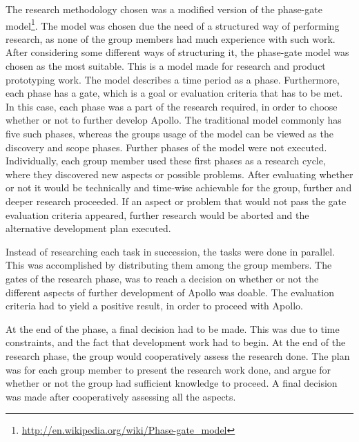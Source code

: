 The research methodology chosen was a modified version of the phase-gate model\footnote{\url{http://en.wikipedia.org/wiki/Phase-gate_model}}. The model was chosen due the need of a structured way of performing research, as none of the group members had much experience with such work. After considering some different ways of structuring it, the phase-gate model was chosen as the most suitable. This is a model made for research and product prototyping work. The model describes a time period as a phase. Furthermore, each phase has a gate, which is a goal or evaluation criteria that has to be met. In this case, each phase was a part of the research required, in order to choose whether or not to further develop Apollo. The traditional model commonly has five such phases, whereas the groups usage of the model can be viewed as the discovery and scope phases. Further phases of the model were not executed. Individually, each group member used these first phases as a research cycle, where they discovered new aspects or possible problems. After evaluating whether or not it would be technically and time-wise achievable for the group, further and deeper research proceeded. If an aspect or problem that would not pass the gate evaluation criteria appeared, further research would be aborted and the alternative development plan executed.

Instead of researching each task in succession, the tasks were done in parallel. This was accomplished by distributing them among the group members. The gates of the research phase, was to reach a decision on whether or not the different aspects of further development of Apollo was doable. The evaluation criteria had to yield a positive result, in order to proceed with Apollo.

At the end of the phase, a final decision had to be made. This was due to time constraints, and the fact that development work had to begin. At the end of the research phase, the group would cooperatively assess the research done. The plan was for each group member to present the research work done, and argue for whether or not the group had sufficient knowledge to proceed. A final decision was made after cooperatively assessing all the aspects.

